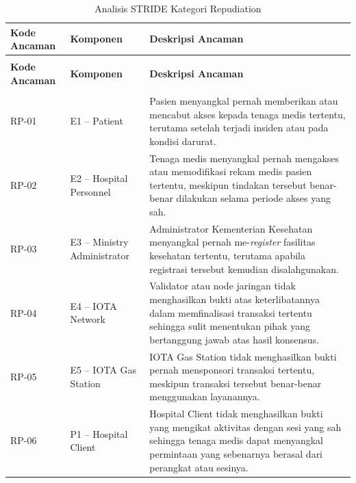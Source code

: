 \begin{xltabular}{\textwidth}{|>{\centering\arraybackslash}p{1.8cm}|>{\raggedright\arraybackslash}p{3.2cm}|X|}
    \caption{Analisis STRIDE Kategori Repudiation}
    \label{tab:stride-repudiation} \\
    \hline
    \textbf{Kode Ancaman} &
    \textbf{Komponen} &
    \textbf{Deskripsi Ancaman} \\
    \hline
    \endfirsthead

    {} \\
    \hline
    \textbf{Kode Ancaman} &
    \textbf{Komponen} &
    \textbf{Deskripsi Ancaman} \\
    \hline
    \endhead

    \hline
     \\
    \endfoot

    \hline
    \endlastfoot

    RP-01 &
    E1 -- Patient &
    Pasien menyangkal pernah memberikan atau mencabut akses kepada tenaga medis tertentu, terutama setelah terjadi insiden atau pada kondisi darurat. \\
    \hline

    RP-02 &
    E2 -- Hospital Personnel &
    Tenaga medis menyangkal pernah mengakses atau memodifikasi rekam medis pasien tertentu, meskipun tindakan tersebut benar-benar dilakukan selama periode akses yang sah. \\
    \hline

    RP-03 &
    E3 -- Ministry Administrator &
    Administrator Kementerian Kesehatan menyangkal pernah me-\textit{register} fasilitas kesehatan tertentu, terutama apabila registrasi tersebut kemudian disalahgunakan. \\
    \hline

    RP-04 &
    E4 -- IOTA Network &
    Validator atau node jaringan tidak menghasilkan bukti atas keterlibatannya dalam memfinalisasi transaksi tertentu sehingga sulit menentukan pihak yang bertanggung jawab atas hasil konsensus. \\
    \hline

    RP-05 &
    E5 -- IOTA Gas Station &
    IOTA Gas Station tidak menghasilkan bukti pernah mensponsori transaksi tertentu, meskipun transaksi tersebut benar-benar menggunakan layanannya. \\
    \hline

    RP-06 &
    P1 -- Hospital Client &
    Hospital Client tidak menghasilkan bukti yang mengikat aktivitas dengan sesi yang sah sehingga tenaga medis dapat menyangkal permintaan yang sebenarnya berasal dari perangkat atau sesinya. \\
    \hline


\end{xltabular}
